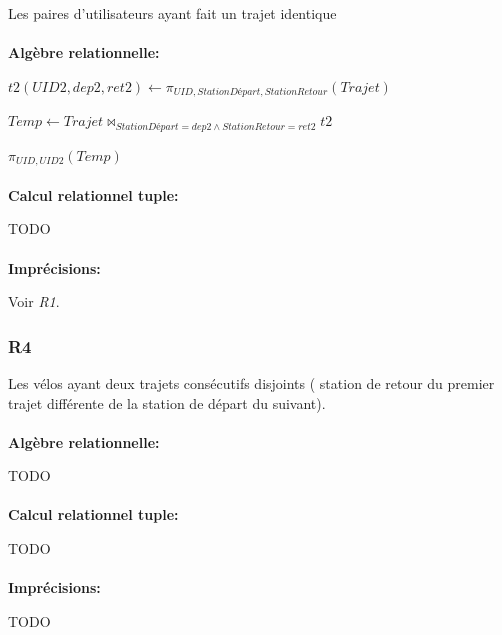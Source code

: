 \documentclass[a4paper, 12pt]{report}
\begin{document}
Les paires d'utilisateurs ayant fait un trajet identique
\paragraph{}
\textbf{Algèbre relationnelle:}

$t2(UID2,dep2,ret2)\leftarrow\pi_{UID,StationDépart,StationRetour}(Trajet)$

$Temp\leftarrow Trajet\bowtie_{StationDépart=dep2\wedge StationRetour=ret2}t2$

$\pi_{UID,UID2}(Temp)$

\paragraph{}
\textbf{Calcul relationnel tuple:}

TODO %

\paragraph{}
\textbf{Imprécisions:}

Voir \textit{R1}.

\subsubsection*{R4}

Les vélos ayant deux trajets consécutifs disjoints ( station de retour du premier trajet différente de la station de départ du suivant).
\paragraph{}
\textbf{Algèbre relationnelle:}

TODO %

\paragraph{}
\textbf{Calcul relationnel tuple:}

TODO %

\paragraph{}
\textbf{Imprécisions:}

TODO%
\end{document}
